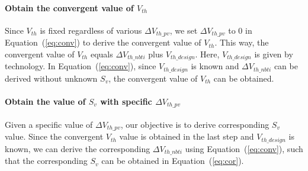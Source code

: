 \paragraph{Obtain the convergent value of $V_{th}$}
Since $V_{th}$ is fixed regardless of various $\Delta V_{th\_pv}$, we set $\Delta V_{th\_pv}$ to 0 in Equation~(\ref{eq:conv}) to derive the convergent value of $V_{th}$. This way, the convergent value of $V_{th}$ equals $\Delta V_{th\_nbti}$ plus $V_{th\_design}$. Here, $V_{th\_design}$ is given by technology. In Equation~(\ref{eq:conv}), since $V_{th\_design}$ is known and $\Delta V_{th\_nbti}$ can be derived without unknown $S_{v}$, the convergent value of $V_{th}$ can be obtained.
\begin{comment}
	\begin{equation}
		\centering
		\fontsize{9}{9} \selectfont
		\Delta V_{th\_nbti} = A \cdot a^n \cdot t^n
		\label{eq:cor2}
	\end{equation}
	\begin{equation}
		\centering
		\fontsize{9}{9} \selectfont
		V_{th} = \Delta V_{th\_nbti} + 0 + V_{th\_design}
		\label{eq:conv2}
	\end{equation}
\end{comment}
\paragraph{Obtain the value of $S_{v}$ with specific $\Delta V_{th\_pv}$}
Given a specific value of $\Delta V_{th\_pv}$, our objective is to derive corresponding $S_{v}$ value. Since the convergent $V_{th}$ value is obtained in the last step and $V_{th\_design}$ is known, we can derive the corresponding $\Delta V_{th\_nbti}$ using Equation~(\ref{eq:conv}), such that the corresponding $S_{v}$ can be obtained in Equation~(\ref{eq:cor}). 

